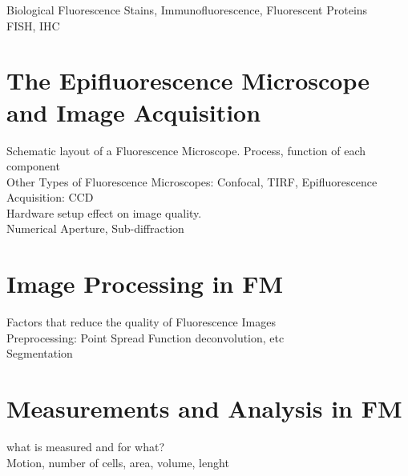 Biological Fluorescence Stains, Immunofluorescence, Fluorescent Proteins\\
FISH, IHC


\section{The Epifluorescence Microscope and Image Acquisition}
\label{sec:TheEpifluorescenceMicroscope}

Schematic layout of a Fluorescence Microscope. Process, function of each component\\
Other Types of Fluorescence Microscopes: Confocal, TIRF, Epifluorescence\\
Acquisition: CCD\\
Hardware setup effect on image quality.\\
Numerical Aperture, Sub-diffraction\\


\section{Image Processing in FM}
\label{sec:ImageProcessingInFM}

Factors that reduce the quality of Fluorescence Images\\
Preprocessing: Point Spread Function deconvolution, etc\\
Segmentation 


\section{Measurements and Analysis in FM}
\label{sec:Measurements}

what is measured and for what?\\
Motion, number of cells, area, volume, lenght